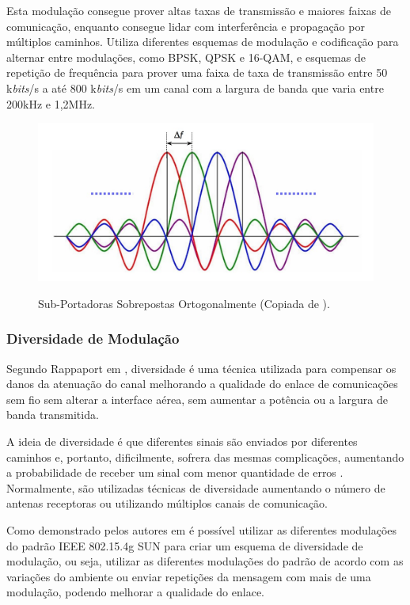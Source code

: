 Esta modulação consegue prover altas taxas de transmissão e maiores faixas de comunicação, enquanto consegue lidar com interferência e propagação por múltiplos caminhos. Utiliza diferentes esquemas de modulação e codificação para alternar entre modulações, como BPSK, QPSK e 16-QAM, e esquemas de repetição de frequência para prover uma faixa de taxa de transmissão entre 50 k\emph{bits}/s a até 800 k\emph{bits}/s em um canal com a largura de banda que varia entre 200kHz e 1,2MHz.

\begin{figure}[ht]
      \begin{center}
            \includegraphics[width=12cm]{./sections/textual/chapters/images/ofdm.jpg}\\
            \caption{Sub-Portadoras Sobrepostas Ortogonalmente (Copiada de \cite{figOFDM}).}
            \label{fig:ofdm}
      \end{center}
\end{figure}

\subsubsection{Diversidade de Modulação}
Segundo Rappaport em \cite{rappaport2009}, diversidade é uma técnica utilizada para compensar os danos da atenuação do canal melhorando a qualidade do enlace de comunicações sem fio sem alterar a interface aérea, sem aumentar a potência ou a largura de banda transmitida.

A ideia de diversidade é que diferentes sinais são enviados por diferentes caminhos e, portanto, dificilmente, sofrera das mesmas complicações, aumentando a probabilidade de receber um sinal com menor quantidade de erros \cite{goldsmith2005wireless}. Normalmente, são utilizadas técnicas de diversidade aumentando o número de antenas receptoras ou utilizando múltiplos canais de comunicação.

Como demonstrado pelos autores em \cite{gomes2020improving} é possível utilizar as diferentes modulações do padrão IEEE 802.15.4g SUN para criar um esquema de diversidade de modulação, ou seja, utilizar as diferentes modulações do padrão de acordo com as variações do ambiente ou enviar repetições da mensagem com mais de uma modulação, podendo melhorar a qualidade do enlace.

